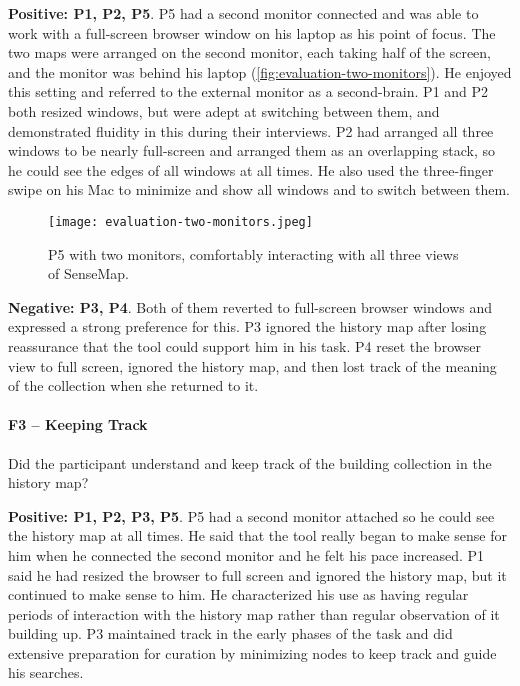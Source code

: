 \textbf{Positive: P1, P2, P5}. P5 had a second monitor connected and was able to work with a full-screen browser window on his laptop as his point of focus. The two maps were arranged on the second monitor, each taking half of the screen, and the monitor was behind his laptop (\autoref{fig:evaluation-two-monitors}). He enjoyed this setting and referred to the external monitor as a second-brain. P1 and P2 both resized windows, but were adept at switching between them, and demonstrated fluidity in this during their interviews. P2 had arranged all three windows to be nearly full-screen and arranged them as an overlapping stack, so he could see the edges of all windows at all times. He also used the three-finger swipe on his Mac to minimize and show all windows and to switch between them.

\begin{figure}
	\centering
	\texttt{[image: evaluation-two-monitors.jpeg]}
	\caption[P5 with two monitors]{P5 with two monitors, comfortably interacting with all three views of SenseMap.}
	\label{fig:evaluation-two-monitors}
\end{figure}

\textbf{Negative: P3, P4}. Both of them reverted to full-screen browser windows and expressed a strong preference for this. P3 ignored the history map after losing reassurance that the tool could support him in his task. P4 reset the browser view to full screen, ignored the history map, and then lost track of the meaning of the collection when she returned to it.

\paragraph{F3 -- Keeping Track}
Did the participant understand and keep track of the building collection in the history map?

\textbf{Positive: P1, P2, P3, P5}. P5 had a second monitor attached so he could see the history map at all times. He said that the tool really began to make sense for him when he connected the second monitor and he felt his pace increased. P1 said he had resized the browser to full screen and ignored the history map, but it continued to make sense to him. He characterized his use as having regular periods of interaction with the history map rather than regular observation of it building up. P3 maintained track in the early phases of the task and did extensive preparation for curation by minimizing nodes to keep track and guide his searches.

